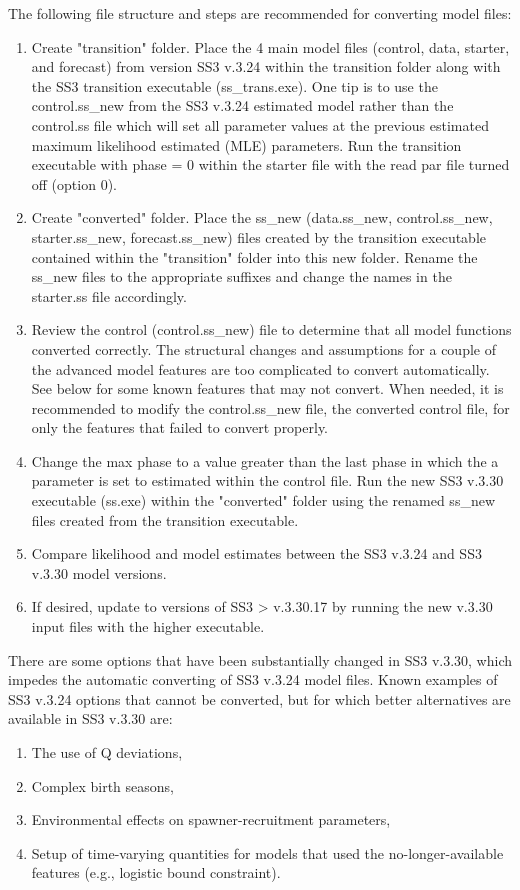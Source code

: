 The following file structure and steps are recommended for converting model files:
\begin{enumerate}
	\item Create "transition" folder.  Place the 4 main model files (control, data, starter, and forecast) from version SS3 v.3.24 within the transition folder along with the SS3 transition executable (ss\_trans.exe).  One tip is to use the control.ss\_new from the SS3 v.3.24 estimated model rather than the control.ss file which will set all parameter values at the previous estimated maximum likelihood estimated (MLE) parameters.  Run the transition executable with phase = 0 within the starter file with the read par file turned off (option 0).
	
	\item Create "converted" folder.  Place the ss\_new (data.ss\_new, control.ss\_new, starter.ss\_new, forecast.ss\_new) files created by the transition executable contained within the "transition" folder into this new folder.  Rename the ss\_new files to the appropriate suffixes and change the names in the starter.ss file accordingly.
	
	\item Review the control (control.ss\_new) file to determine that all model functions converted correctly.  The structural changes and assumptions for a couple of the advanced model features are too complicated to convert automatically.  See below for some known features that may not convert. When needed, it is recommended to modify the control.ss\_new file, the converted control file, for only the features that failed to convert properly.
	
	\item Change the max phase to a value greater than the last phase in which the a parameter is set to estimated within the control file.  Run the new SS3 v.3.30 executable (ss.exe) within the "converted" folder using the renamed ss\_new files created from the transition executable.
	
	\item Compare likelihood and model estimates between the SS3 v.3.24 and SS3 v.3.30 model versions.
	
	\item If desired, update to versions of SS3 > v.3.30.17 by running the new v.3.30 input files with the higher executable.
\end{enumerate}

\noindent There are some options that have been substantially changed in SS3 v.3.30, which impedes the automatic converting of SS3 v.3.24 model files. Known examples of SS3 v.3.24 options that cannot be converted, but for which better alternatives are available in SS3 v.3.30 are:
\begin{enumerate}
	\item The use of Q deviations,
	\item Complex birth seasons,
	\item Environmental effects on spawner-recruitment parameters,
	\item Setup of time-varying quantities for models that used the no-longer-available features (e.g., logistic bound constraint).\end{enumerate}

\pagebreak
